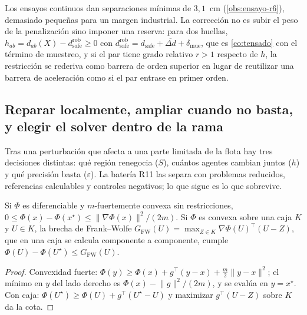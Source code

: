 \begin{observacion}
\label{obs:reserva-robusta}
Los ensayos continuos dan separaciones mínimas de $3{,}1$~cm
(\cref{obs:ensayo-r6}), demasiado pequeñas para un margen industrial. La
corrección no es subir el peso de la penalización sino imponer una reserva:
para dos huellas, $h_{ab}=d_{ab}(X)-d^{\mathrm{rob}}_{\mathrm{safe}}\ge0$ con
$d^{\mathrm{rob}}_{\mathrm{safe}}=d_{\mathrm{safe}}+\overline{\Delta d}+\delta_{\mathrm{mue}}$,
que es \cref{co:tensado} con el término de muestreo, y si el par tiene grado
relativo $r>1$ respecto de $h$, la restricción se rederiva como barrera de
orden superior en lugar de reutilizar una barrera de aceleración como si el
par entrase en primer orden.
\end{observacion}

\subsection{Reparar localmente, ampliar cuando no basta, y elegir el solver dentro de la rama}

Tras una perturbación que afecta a una parte limitada de la flota hay tres
decisiones distintas: qué región renegocia ($S$), cuántos agentes cambian
juntos ($h$) y qué precisión basta ($\varepsilon$). La batería R11
\cite{mrob2026r11} las separa con problemas reducidos, referencias
calculables y controles negativos; lo que sigue es lo que sobrevive.

\begin{proposicion}
\label{pr:certificado-gradiente}
Si $\Phi$ es diferenciable y $m$-fuertemente convexa sin restricciones,
$0\le\Phi(x)-\Phi(x^\star)\le\lVert\nabla\Phi(x)\rVert^2/(2m)$. Si $\Phi$ es
convexa sobre una caja $K$ y $U\in K$, la brecha de Frank--Wolfe
$G_{\mathrm{FW}}(U)=\max_{Z\in K}\nabla\Phi(U)^{\!\top}(U-Z)$, que en una caja
se calcula componente a componente, cumple
$\Phi(U)-\Phi(U^\star)\le G_{\mathrm{FW}}(U)$.
\end{proposicion}

\begin{proof}
Convexidad fuerte: $\Phi(y)\ge\Phi(x)+g^{\!\top}(y-x)+\tfrac m2\lVert y-x\rVert^2$;
el mínimo en $y$ del lado derecho es $\Phi(x)-\lVert g\rVert^2/(2m)$, y se
evalúa en $y=x^\star$. Con caja: $\Phi(U^\star)\ge\Phi(U)+g^{\!\top}(U^\star-U)$
y maximizar $g^{\!\top}(U-Z)$ sobre $K$ da la cota.
\end{proof}

